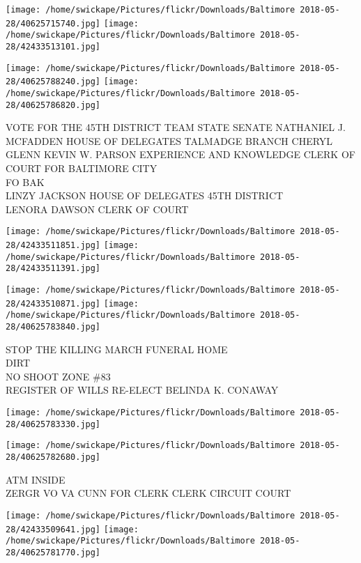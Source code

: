 \documentclass[10pt,letterpaper]{article}
\begin{document}
\texttt{[image: /home/swickape/Pictures/flickr/Downloads/Baltimore 2018-05-28/40625715740.jpg]}
\texttt{[image: /home/swickape/Pictures/flickr/Downloads/Baltimore 2018-05-28/42433513101.jpg]}

\texttt{[image: /home/swickape/Pictures/flickr/Downloads/Baltimore 2018-05-28/40625788240.jpg]}
\texttt{[image: /home/swickape/Pictures/flickr/Downloads/Baltimore 2018-05-28/40625786820.jpg]}

VOTE FOR THE 45TH DISTRICT TEAM STATE SENATE NATHANIEL J. MCFADDEN HOUSE OF DELEGATES TALMADGE BRANCH CHERYL GLENN KEVIN W. PARSON EXPERIENCE AND KNOWLEDGE CLERK OF COURT FOR BALTIMORE CITY\\
FO BAK\\
LINZY JACKSON HOUSE OF DELEGATES 45TH DISTRICT\\
LENORA DAWSON CLERK OF COURT\\
\pagebreak

\texttt{[image: /home/swickape/Pictures/flickr/Downloads/Baltimore 2018-05-28/42433511851.jpg]}
\texttt{[image: /home/swickape/Pictures/flickr/Downloads/Baltimore 2018-05-28/42433511391.jpg]}

\texttt{[image: /home/swickape/Pictures/flickr/Downloads/Baltimore 2018-05-28/42433510871.jpg]}
\texttt{[image: /home/swickape/Pictures/flickr/Downloads/Baltimore 2018-05-28/40625783840.jpg]}

STOP THE KILLING MARCH FUNERAL HOME\\
DIRT\\
NO SHOOT ZONE \#83\\
REGISTER OF WILLS RE{-}ELECT BELINDA K. CONAWAY\\
\pagebreak

\texttt{[image: /home/swickape/Pictures/flickr/Downloads/Baltimore 2018-05-28/40625783330.jpg]}

\vspace{0.25in}
\texttt{[image: /home/swickape/Pictures/flickr/Downloads/Baltimore 2018-05-28/40625782680.jpg]}

ATM INSIDE\\
ZERGR VO VA CUNN FOR CLERK CLERK CIRCUIT COURT\\
\pagebreak

\texttt{[image: /home/swickape/Pictures/flickr/Downloads/Baltimore 2018-05-28/42433509641.jpg]}
\texttt{[image: /home/swickape/Pictures/flickr/Downloads/Baltimore 2018-05-28/40625781770.jpg]}
\end{document}
